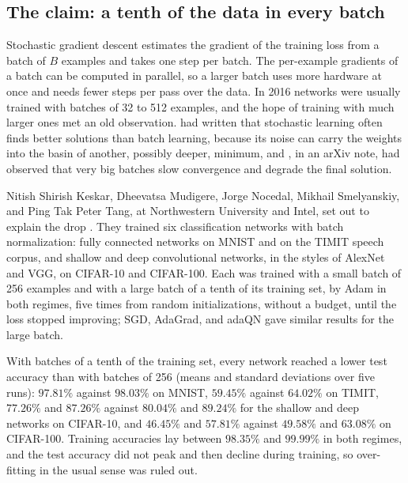 \begin{refsection}
\section{The claim: a tenth of the data in every batch}\label{sec:heldfixed:claim}

Stochastic gradient descent estimates the gradient of the training loss from a batch of $B$ examples and takes one step per batch. The per-example gradients of a batch can be computed in parallel, so a larger batch uses more hardware at once and needs fewer steps per pass over the data. In 2016 networks were usually trained with batches of 32 to 512 examples, and the hope of training with much larger ones met an old observation. \Textcite{LeCunEtAl1998} had written that stochastic learning often finds better solutions than batch learning, because its noise can carry the weights into the basin of another, possibly deeper, minimum, and \textcite{Krizhevsky2014}, in an arXiv note, had observed that very big batches slow convergence and degrade the final solution.

Nitish Shirish Keskar, Dheevatsa Mudigere, Jorge Nocedal, Mikhail Smelyanskiy, and Ping Tak Peter Tang, at Northwestern University and Intel, set out to explain the drop \parencite{KeskarEtAl2017}. They trained six classification networks with batch normalization: fully connected networks on MNIST and on the TIMIT speech corpus, and shallow and deep convolutional networks, in the styles of AlexNet and VGG, on CIFAR-10 and CIFAR-100. Each was trained with a small batch of 256 examples and with a large batch of a tenth of its training set, by Adam in both regimes, five times from random initializations, without a budget, until the loss stopped improving; SGD, AdaGrad, and adaQN gave similar results for the large batch.

\begin{finding}\label{fd:heldfixed:keskar}
With batches of a tenth of the training set, every network reached a lower test accuracy than with batches of 256 (means and standard deviations over five runs): $97.81\%$ against $98.03\%$ on MNIST, $59.45\%$ against $64.02\%$ on TIMIT, $77.26\%$ and $87.26\%$ against $80.04\%$ and $89.24\%$ for the shallow and deep networks on CIFAR-10, and $46.45\%$ and $57.81\%$ against $49.58\%$ and $63.08\%$ on CIFAR-100. Training accuracies lay between $98.35\%$ and $99.99\%$ in both regimes, and the test accuracy did not peak and then decline during training, so over-fitting in the usual sense was ruled out.
\end{finding}


\end{refsection}
